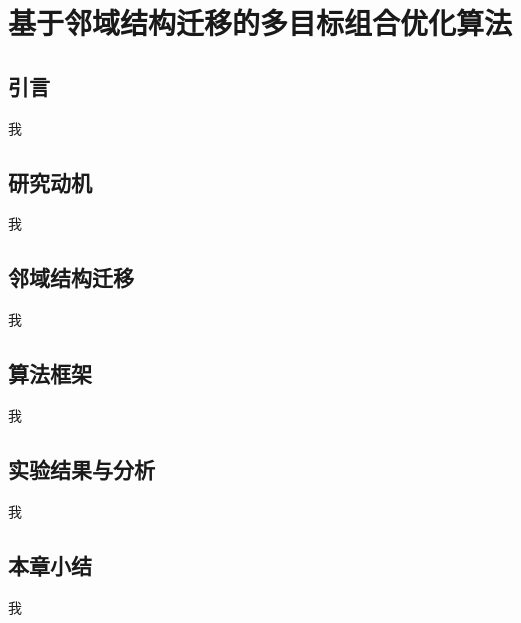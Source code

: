 \chapter{基于邻域结构迁移的多目标组合优化算法}

\section{引言}

我

\section{研究动机}

我

\section{邻域结构迁移}

我

\section{算法框架}

我

\section{实验结果与分析}

我

\section{本章小结}

我